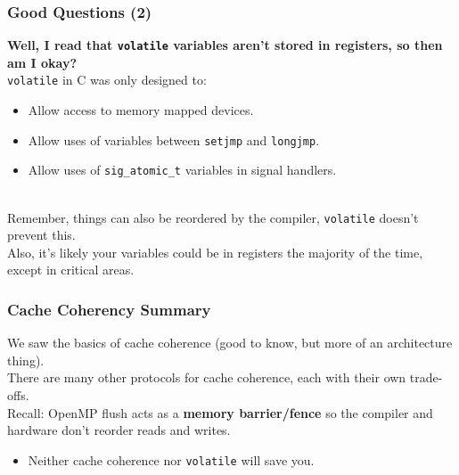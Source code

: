 \documentclass[aspectratio=43]{beamer}
\newenvironment{changemargin}[1]{%
  \begin{list}{}{%
    \setlength{\topsep}{0pt}%
    \setlength{\leftmargin}{#1}%
    \setlength{\rightmargin}{1em}
    \setlength{\listparindent}{\parindent}%
    \setlength{\itemindent}{\parindent}%
    \setlength{\parsep}{\parskip}%
  }%
  \item[]}{\end{list}}
\begin{document}
\begin{frame}[fragile]
  \frametitle{Good Questions (2)}

  \begin{changemargin}{1cm}
  {\bf Well, I read that {\tt volatile} variables aren't stored in registers,
    so then am I okay?}\\[1em]

    {\tt volatile} in C was only designed to:
      \begin{itemize}
        \item Allow access to memory mapped devices.
        \item Allow uses of variables between {\tt setjmp} and {\tt longjmp}.
        \item Allow uses of {\tt sig\_atomic\_t} variables in signal handlers.
      \end{itemize}~\\[1em]
    Remember, things can also be reordered by the compiler,
      {\tt volatile} doesn't prevent this.\\[1em]
    Also, it's likely your variables could be in registers the majority
      of the time, except in critical areas.
  \end{changemargin}
\end{frame}

\begin{frame}
  \frametitle{Cache Coherency Summary}

  \begin{changemargin}{1cm}
    We saw the basics of cache coherence (good to know, but more of an architecture
      thing).\\[1em]
    There are many other protocols for cache coherence, each with their own
      trade-offs.\\[1em]

     Recall: OpenMP flush acts as a {\bf memory barrier/fence} so the
      compiler and hardware don't reorder reads and writes.\\[1em]
    \begin{itemize}
     \item Neither cache coherence nor {\tt volatile} will save you.
    \end{itemize}

  \end{changemargin}
\end{frame}
\end{document}
